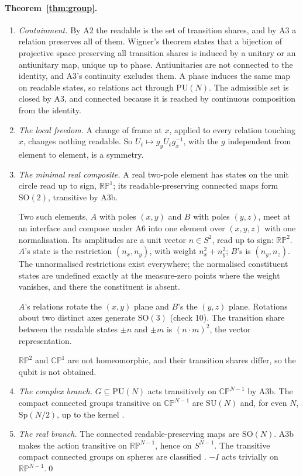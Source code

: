 \documentclass[11pt,a4paper]{article}
\theoremstyle{plain}
\theoremstyle{definition}
\theoremstyle{remark}
\newcommand{\RP}{\mathbb{RP}}
\newcommand{\CP}{\mathbb{CP}}
\newcommand{\SO}{\mathrm{SO}}
\newcommand{\SU}{\mathrm{SU}}
\newcommand{\PU}{\mathrm{PU}}
\newcommand{\Sp}{\mathrm{Sp}}
\begin{document}
\paragraph{Theorem~\ref{thm:group}.}
\begin{enumerate}[label=(\roman*), leftmargin=2em, itemsep=4pt]
\item \emph{Containment.} By A2 the readable is the set of transition shares, and by A3 a relation preserves all of them. Wigner's theorem states that a bijection of projective space preserving all transition shares is induced by a unitary or an antiunitary map, unique up to phase. Antiunitaries are not connected to the identity, and A3's continuity excludes them. A phase induces the same map on readable states, so relations act through $\PU(N)$. The admissible set is closed by A3, and connected because it is reached by continuous composition from the identity.
\item \emph{The local freedom.} A change of frame at $x$, applied to every relation touching $x$, changes nothing readable. So $U_\ell\mapsto g_yU_\ell g_x^{-1}$, with the $g$ independent from element to element, is a symmetry.
\item \emph{The minimal real composite.} A real two-pole element has states on the unit circle read up to sign, $\RP^1$; its readable-preserving connected maps form $\SO(2)$, transitive by A3b.

Two such elements, $A$ with poles $(x,y)$ and $B$ with poles $(y,z)$, meet at an interface and compose under A6 into one element over $(x,y,z)$ with one normalisation. Its amplitudes are a unit vector $n\in S^2$, read up to sign: $\RP^2$. $A$'s state is the restriction $(n_x,n_y)$, with weight $n_x^2+n_y^2$; $B$'s is $(n_y,n_z)$. The unnormalised restrictions exist everywhere; the normalised constituent states are undefined exactly at the measure-zero points where the weight vanishes, and there the constituent is absent.

$A$'s relations rotate the $(x,y)$ plane and $B$'s the $(y,z)$ plane. Rotations about two distinct axes generate $\SO(3)$ (check 10). The transition share between the readable states $\pm n$ and $\pm m$ is $(n\cdot m)^2$, the vector representation.

$\RP^2$ and $\CP^1$ are not homeomorphic, and their transition shares differ, so the qubit is not obtained.
\item \emph{The complex branch.} $G\subseteq\PU(N)$ acts transitively on $\CP^{N-1}$ by A3b. The compact connected groups transitive on $\CP^{N-1}$ are $\SU(N)$ and, for even $N$, $\Sp(N/2)$, up to the kernel \cite{onishchik}.
\item \emph{The real branch.} The connected readable-preserving maps are $\SO(N)$. A3b makes the action transitive on $\RP^{N-1}$, hence on $S^{N-1}$. The transitive compact connected groups on spheres are classified \cite{ms,borel}. $-I$ acts trivially on $\RP^{N-1}$.\qed
\end{enumerate}
\end{document}
